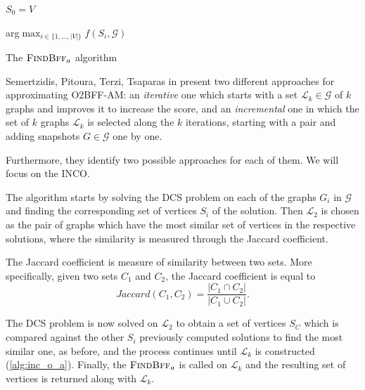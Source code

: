 \begin{algorithm}
	\SetAlgoLined
	$S_{0} = V$ \;


	\Return arg$\max _{i \in \{ 1, \dots, |V|\}} f(S_{i}, \mathcal{G})  $
	\caption{The $\textsc{FindBff}_{a} $ algorithm}
	\label{alg:findbff_a}
\end{algorithm}

Semertzidis, Pitoura, Terzi, Tsaparas in \cite{semertzidis2019finding} present
two different approaches for approximating \acrshort{O2BFF}-AM: an \emph{iterative} one
which starts with a set $\mathcal{L} _{k} \in \mathcal{G} $ of $k$ graphs and improves it to
increase the score, and an \emph{incremental} one in which the set of $k$
graphs $\mathcal{L}_{k} $ is selected along the $k$ iterations, starting with a
pair and adding snapshots $G \in \mathcal{G} $ one by one.

Furthermore, they identify two possible approaches for each of them. We will
focus on the \acrfull{INCO}.

The algorithm starts by solving the \acrshort{DCS} problem on each of the
graphs $G_{i} $ in $\mathcal{G} $ and finding the corresponding set of vertices
$S_{i} $ of the solution. Then $\mathcal{L}_{2}  $ is chosen as the pair of graphs which
have the most similar set of vertices in the respective solutions, where the
similarity is measured through the Jaccard coefficient.

The Jaccard coefficient is measure of similarity between two sets. More specifically, given two sets $C_1$ and $C_2$, the Jaccard coefficient is equal
to \cite{CharuC.Aggarwal2013}
\begin{equation*}
	Jaccard(C_1, C_2) = \frac{|C_1 \cap C_2|}{|C_1 \cup C_2|}.
\end{equation*}

The \acrshort{DCS} problem is now solved on $\mathcal{L} _{2} $ to obtain a set
of vertices $S_C$ which is compared against the other $S_i$ previously computed
solutions to
find the most similar one, as before, and the process continues until
$\mathcal{L}_{k} $ is constructed (\autoref{alg:inc_o_a}). Finally, the
$\textsc{FindBff}_{a} $ is called on $\mathcal{L}_{k}  $ and the resulting set of
vertices is returned along with $\mathcal{L}_{k}  $.

